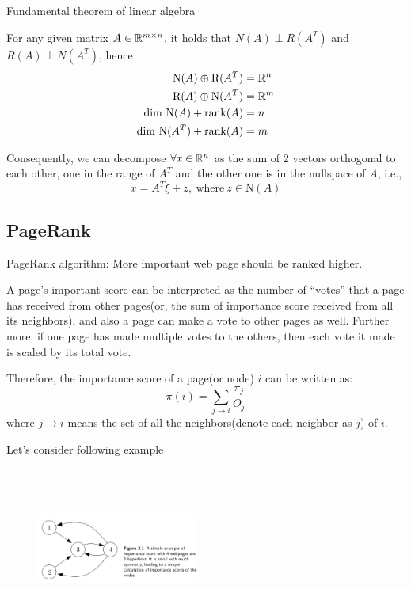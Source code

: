 \begin{theorem}{Fundamental theorem of linear algebra}
	
	For any given matrix $A\in \mathbb{R}^{m\times n}$, it holds that $N(A) \perp R(A^T)$ and $R(A) \perp N(A^T)$, hence
	\begin{align*}
	\text{N}(A) \oplus \text{R}(A^T) &= \mathbb{R}^n\\
	\text{R}(A) \oplus \text{N}(A^T) &= \mathbb{R}^m\\
	\text{dim } \text{N}(A) + \operatorname{rank}(A) &=n\\
	\text{dim } \text{N}(A^T) + \operatorname{rank}(A) &=m
	\end{align*}
\end{theorem}

Consequently, we can decompose $\forall x\in \mathbb{R}^n$ as the sum of 2 vectors orthogonal to each other, one in the range of $A^T$ and the other one is in the nullspace of $A$, i.e.,
$$x = A^T\xi + z,\ \text{where}\ z\in \text{N}(A)$$




\subsection{PageRank}


PageRank algorithm: More important web page should be ranked higher.


A page's important score can be interpreted as the number of “votes” that a page has received from other pages(or, the sum of importance score received from all its neighbors), and also a page can make a vote to other pages as well. Further more, if one page has made multiple votes to the others, then each vote it made is scaled by its total vote.

Therefore, the importance score of a page(or node) $i$ can be written as:
$$\pi(i)=\sum_{j \rightarrow i}\frac{\pi_j}{O_j}$$
where $j \rightarrow i$ means the set of all the neighbors(denote each neighbor as $j$) of $i$.

Let's consider following example
\begin{figure}
	\centering
	\includegraphics[width=2.1in,height=2.1in]{figures/ch03/figure0.jpg}
\end{figure}


